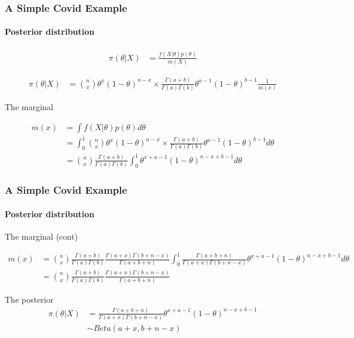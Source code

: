 \documentclass[
  shownotes,
  xcolor={svgnames},
  hyperref={colorlinks,citecolor=DarkBlue,linkcolor=DarkRed,urlcolor=DarkBlue}
  , aspectratio=169]{beamer}
\begin{document}
\begin{frame}[fragile]
\frametitle{A Simple Covid Example}
\framesubtitle{Posterior distribution}

\begin{align}
\pi(\theta|X) &= \frac{f(X|\theta)p(\theta)}{m(X)} 
\end{align}


\begin{align}
\pi(\theta|X) &=  \binom{n}{x}\theta^x(1-\theta)^{n-x} \times\frac{\Gamma(a+b)}{\Gamma(a)\Gamma(b)}\theta^{a-1}(1-\theta)^{b-1}  \frac{1}{m(x)}
\end{align}

The marginal

\begin{scriptsize}
\begin{align}
m(x) &= \int f(X|\theta)p(\theta)d\theta \\
 &= \int_0^1 \binom{n}{x}\theta^x(1-\theta)^{n-x} \times\frac{\Gamma(a+b)}{\Gamma(a)\Gamma(b)}\theta^{a-1}(1-\theta)^{b-1}  d\theta \\
 &= \binom{n}{x} \frac{\Gamma(a+b)}{\Gamma(a)\Gamma(b)} \int_0^1 \theta^{x+a-1}(1-\theta)^{n-x+b-1}  d\theta 
\end{align}
\end{scriptsize}
\end{frame}
\begin{frame}[fragile]
\frametitle{A Simple Covid Example}
\framesubtitle{Posterior distribution}
The marginal (cont)

\begin{scriptsize}
\begin{align}
 m(x) &= \binom{n}{x} \frac{\Gamma(a+b)}{\Gamma(a)\Gamma(b)}  \frac{\Gamma(a+x)\Gamma(b+n-x)}{\Gamma(a+b+n)} \int_0^1  \frac{\Gamma(a+b+n)}{\Gamma(a+x)\Gamma(b+n-x)} \theta^{x+a-1}(1-\theta)^{n-x+b-1}  d\theta \\
 &= \binom{n}{x} \frac{\Gamma(a+b)}{\Gamma(a)\Gamma(b)}  \frac{\Gamma(a+x)\Gamma(b+n-x)}{\Gamma(a+b+n)}
\end{align}
\end{scriptsize}

The posterior
\begin{align}
\pi(\theta|X) &=  \frac{\Gamma(a+b+n)}{\Gamma(a+x)\Gamma(b+n-x)} \theta^{x+a-1}(1-\theta)^{n-x+b-1}  \\
              &\sim Beta(a+x,b+n-x)
\end{align}

\end{frame}
\end{document}
